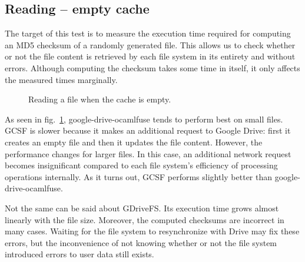 \subsection{Reading -- empty cache} \label{reading_empty_cache}

The target of this test is to measure the execution time required for computing an MD5 checksum of a randomly generated file. This allows us to check whether or not the file content is retrieved by each file system in its entirety and without errors. Although computing the checksum takes some time in itself, it only affects the measured times marginally.


\begin{figure}[bpt]
\centering
{}
\caption{Reading a file when the cache is empty.}
\label{fig:fresh_read_benchmark}
\end{figure}

As seen in fig.~\ref{fig:fresh_read_benchmark}, google-drive-ocamlfuse tends to perform best on small files. GCSF is slower because it makes an additional request to Google Drive: first it creates an empty file and then it updates the file content. However, the performance changes for larger files. In this case, an additional network request becomes insignificant compared to each file system's efficiency of processing operations internally. As it turns out, GCSF performs slightly better than google-drive-ocamlfuse.

Not the same can be said about GDriveFS. Its execution time grows almost linearly with the file size. Moreover, the computed checksums are incorrect in many cases. Waiting for the file system to resynchronize with Drive may fix these errors, but the inconvenience of not knowing whether or not the file system introduced errors to user data still exists.

